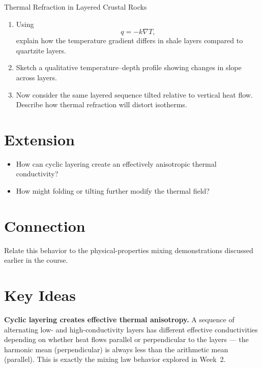 \begin{activity}{Thermal Refraction in Layered Crustal Rocks}
\begin{enumerate}
  \item Using
  \[
    q = -k \nabla T,
  \]
  explain how the temperature gradient differs in shale layers compared to quartzite layers.
  \answerbox[3cm]

  \item Sketch a qualitative temperature--depth profile showing changes in slope across layers.
  \answerbox[5cm]

  \item Now consider the same layered sequence tilted relative to vertical heat flow. Describe how thermal refraction will distort isotherms.
  \answerbox[3cm]
\end{enumerate}

\section*{Extension}
\begin{itemize}
  \item How can cyclic layering create an effectively anisotropic thermal conductivity?
  \answerbox[3cm]
  \item How might folding or tilting further modify the thermal field?
  \answerbox[3cm]
\end{itemize}

\section*{Connection}
Relate this behavior to the physical-properties mixing demonstrations discussed earlier in the course.

\answerbox[3cm]

{\color{red}
\section*{Key Ideas}

{\color{blue}
\textbf{Cyclic layering creates effective thermal anisotropy.} A sequence of alternating low- and high-conductivity layers has different effective conductivities depending on whether heat flows parallel or perpendicular to the layers --- the harmonic mean (perpendicular) is always less than the arithmetic mean (parallel). This is exactly the mixing law behavior explored in Week~2.

\begin{figure}[h]
\centering
{}
\end{figure}}}
\end{activity}

